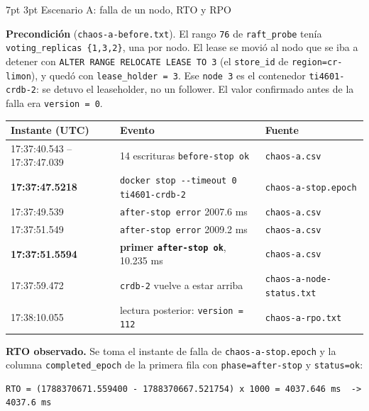 \documentclass[10pt,letterpaper]{article}
\makeatletter
\renewcommand\section{\@startsection{section}{1}{\z@}%
  {7pt \@plus 2pt \@minus 1pt}{3pt}%
  {\normalfont\normalsize\bfseries\color{acc}}}
\makeatother
\begin{document}
\section{Escenario A: falla de un nodo, RTO y RPO}

\textbf{Precondición} (\texttt{chaos-a-before.txt}). El rango \texttt{76} de \texttt{raft\_probe}
tenía \texttt{voting\_replicas \{1,3,2\}}, una por nodo. El lease se movió al nodo que se iba a
detener con \texttt{ALTER RANGE RELOCATE LEASE TO 3} (el \texttt{store\_id} de
\texttt{region=cr-limon}), y quedó con \texttt{lease\_holder = 3}. Ese \texttt{node 3} es el
contenedor \texttt{ti4601-crdb-2}: se detuvo el leaseholder, no un follower. El valor confirmado antes
de la falla era \texttt{version = 0}.

\begin{center}\footnotesize
\begin{tabular}{@{}lll@{}}
\toprule
\textbf{Instante (UTC)} & \textbf{Evento} & \textbf{Fuente} \\
\midrule
17:37:40.543 -- 17:37:47.039 & 14 escrituras \texttt{before-stop ok} & \texttt{chaos-a.csv} \\
\textbf{17:37:47.5218} & \texttt{docker stop -{}-timeout 0 ti4601-crdb-2} & \texttt{chaos-a-stop.epoch} \\
17:37:49.539 & \texttt{after-stop error} 2007.6 ms & \texttt{chaos-a.csv} \\
17:37:51.549 & \texttt{after-stop error} 2009.2 ms & \texttt{chaos-a.csv} \\
\textbf{17:37:51.5594} & \textbf{primer \texttt{after-stop ok}}, 10.235 ms & \texttt{chaos-a.csv} \\
17:37:59.472 & \texttt{crdb-2} vuelve a estar arriba & \texttt{chaos-a-node-status.txt} \\
17:38:10.055 & lectura posterior: \texttt{version = 112} & \texttt{chaos-a-rpo.txt} \\
\bottomrule
\end{tabular}
\end{center}

\textbf{RTO observado.} Se toma el instante de falla de \texttt{chaos-a-stop.epoch} y la columna
\texttt{completed\_epoch} de la primera fila con \texttt{phase=after-stop} y \texttt{status=ok}:

{\footnotesize
\begin{verbatim}
RTO = (1788370671.559400 - 1788370667.521754) x 1000 = 4037.646 ms  ->  4037.6 ms
\end{verbatim}}
\vspace{2pt}
\end{document}
